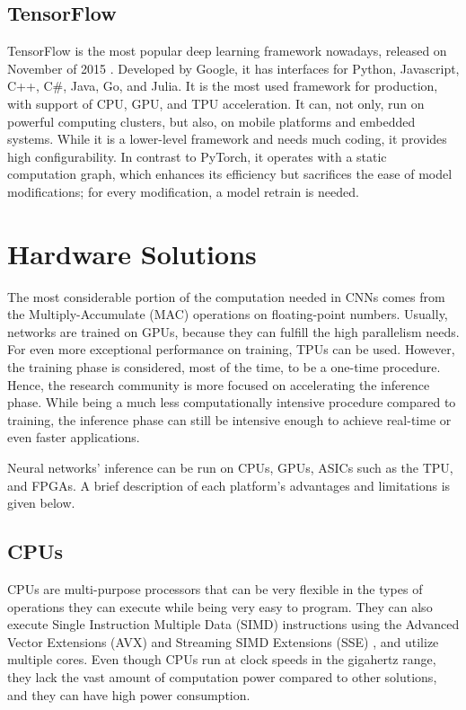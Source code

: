 \subsection{TensorFlow}
TensorFlow \cite{TensorFlow-Large-Scale-Machine-Learning-on-Heterogeneous-Distributed-Systems} \cite{TensorFlow-Official-site} \cite{TensorFlow-Wikipedia} is the most popular deep learning framework nowadays, released on November of 2015 \cite{Google-Just-Open-Sourced-TensorFlow}. Developed by Google, it has interfaces for Python, Javascript, C++, C\#, Java, Go, and Julia. It is the most used framework for production, with support of CPU, GPU, and TPU acceleration. It can, not only, run on powerful computing clusters, but also, on mobile platforms and embedded systems. While it is a lower-level framework and needs much coding, it provides high configurability. In contrast to PyTorch, it operates with a static computation graph, which enhances its efficiency but sacrifices the ease of model modifications; for every modification, a model retrain is needed.

\section{Hardware Solutions}
The most considerable portion of the computation needed in CNNs comes from the Multiply-Accumulate (MAC) operations on floating-point numbers. Usually, networks are trained on GPUs, because they can fulfill the high parallelism needs. For even more exceptional performance on training, TPUs can be used. However, the training phase is considered, most of the time, to be a one-time procedure. Hence, the research community is more focused on accelerating the inference phase. While being a much less computationally intensive procedure compared to training, the inference phase can still be intensive enough to achieve real-time or even faster applications.

Neural networks' inference can be run on CPUs, GPUs, ASICs such as the TPU, and FPGAs. A brief description of each platform's advantages and limitations is given below.

\subsection{CPUs}
CPUs are multi-purpose processors that can be very flexible in the types of operations they can execute while being very easy to program. They can also execute Single Instruction Multiple Data (SIMD) instructions using the Advanced Vector Extensions (AVX) \cite{AVX-Wikipedia} and Streaming SIMD Extensions (SSE) \cite{SSE-Wikipedia}, and utilize multiple cores. Even though CPUs run at clock speeds in the gigahertz range, they lack the vast amount of computation power compared to other solutions, and they can have high power consumption.


